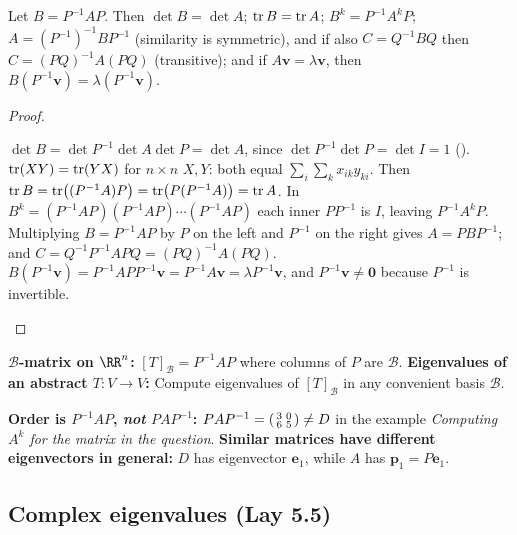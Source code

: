 \documentclass[10pt]{scrartcl}
\newcommand{\vv}[1]{\mathbf{#1}}
\begin{document}
\begin{proposition*}
  Let $B=P^{-1}AP$. Then $\det B=\det A$; $\operatorname{tr} B=\operatorname{tr} A$; $B^k=P^{-1}A^kP$; $A=(P^{-1})^{-1}BP^{-1}$ (similarity is symmetric), and if also $C=Q^{-1}BQ$ then $C=(PQ)^{-1}A(PQ)$ (transitive); and if $A\vv v=\lambda\vv v$, then $B(P^{-1}\vv v)=\lambda(P^{-1}\vv v)$.
\end{proposition*}
\begin{proof}
  \begin{steps}
    \ii $\det B=\det P^{-1}\det A\det P=\det A$, since $\det P^{-1}\det P=\det I=1$ ().
    \ii \textbf{$\operatorname{tr}(XY)=\operatorname{tr}(YX)$} for $n\times n$ $X,Y$: both equal $\sum_i\sum_k x_{ik}y_{ki}$. Then $\operatorname{tr} B=\operatorname{tr}\bigl((P^{-1}A)P\bigr)=\operatorname{tr}\bigl(P(P^{-1}A)\bigr)=\operatorname{tr} A$.
    \ii In $B^k=(P^{-1}AP)(P^{-1}AP)\cdots(P^{-1}AP)$ each inner $PP^{-1}$ is $I$, leaving $P^{-1}A^kP$.
    \ii Multiplying $B=P^{-1}AP$ by $P$ on the left and $P^{-1}$ on the right gives $A=PBP^{-1}$; and $C=Q^{-1}P^{-1}APQ=(PQ)^{-1}A(PQ)$.
    \ii $B(P^{-1}\vv v)=P^{-1}AP P^{-1}\vv v=P^{-1}A\vv v=\lambda P^{-1}\vv v$, and $P^{-1}\vv v\ne\vv 0$ because $P^{-1}$ is invertible.
  \end{steps}
\end{proof}

\begin{shortcuts}
  \ii \textbf{$\mathcal B$-matrix on $\RR^n$:} $[T]_{\mathcal B}=P^{-1}AP$ where columns of $P$ are $\mathcal B$.
  \ii \textbf{Eigenvalues of an abstract $T\colon V\to V$:} Compute eigenvalues of $[T]_{\mathcal B}$ in any convenient basis $\mathcal B$.
\end{shortcuts}

\begin{trapbox}
  \ii \textbf{Order is $P^{-1}AP$, \emph{not} $PAP^{-1}$:} $PAP^{-1}=\begin{psmallmatrix}3&0\\6&5\end{psmallmatrix}\neq D$ in the example \emph{Computing $A^k$ for the matrix in the question}.
  \ii \textbf{Similar matrices have different eigenvectors in general:} $D$ has eigenvector $\vv e_1$, while $A$ has $\vv p_1=P\vv e_1$.
\end{trapbox}

\subsection{Complex eigenvalues (Lay 5.5)}
\end{document}
